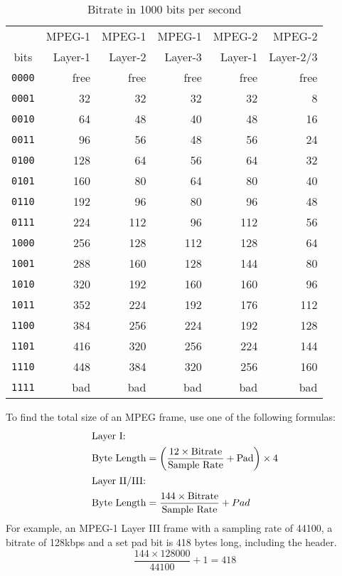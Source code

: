 \begin{table}[h]
{
\begin{tabular}{|c||r|r|r|r|r|}
\hline
& MPEG-1 & MPEG-1 & MPEG-1 & MPEG-2 & MPEG-2 \\
bits & Layer-1 & Layer-2 & Layer-3 & Layer-1 & Layer-2/3 \\
\hline
\texttt{0000} & free & free & free & free & free \\
\texttt{0001} & 32 & 32 & 32 & 32 & 8 \\
\texttt{0010} & 64 & 48 & 40 & 48 & 16 \\
\texttt{0011} & 96 & 56 & 48 & 56 & 24 \\
\texttt{0100} & 128 & 64 & 56 & 64 & 32 \\
\texttt{0101} & 160 & 80 & 64 & 80 & 40 \\
\texttt{0110} & 192 & 96 & 80 & 96 & 48 \\
\texttt{0111} & 224 & 112 & 96 & 112 & 56 \\
\texttt{1000} & 256 & 128 & 112 & 128 & 64 \\
\texttt{1001} & 288 & 160 & 128 & 144 & 80 \\
\texttt{1010} & 320 & 192 & 160 & 160 & 96 \\
\texttt{1011} & 352 & 224 & 192 & 176 & 112 \\
\texttt{1100} & 384 & 256 & 224 & 192 & 128 \\
\texttt{1101} & 416 & 320 & 256 & 224 & 144 \\
\texttt{1110} & 448 & 384 & 320 & 256 & 160 \\
\texttt{1111} & bad & bad & bad & bad & bad \\
\hline
\end{tabular}
}
\caption{Bitrate in 1000 bits per second}
\end{table}
To find the total size of an MPEG frame, use one of the following
formulas:
\begin{align}
\intertext{Layer I:}
\text{Byte Length} &= \left ( \frac{12 \times \text{Bitrate}}{\text{Sample Rate}} + \text{Pad} \right ) \times 4 \\
\intertext{Layer II/III:}
\text{Byte Length} &= \frac{144 \times \text{Bitrate}}{\text{Sample Rate}} + Pad
\end{align}
For example, an MPEG-1 Layer III frame with a sampling rate of 44100,
a bitrate of 128kbps and a set pad bit is 418 bytes long, including the header.
\begin{equation}
\frac{144 \times 128000}{44100} + 1 = 418
\end{equation}

